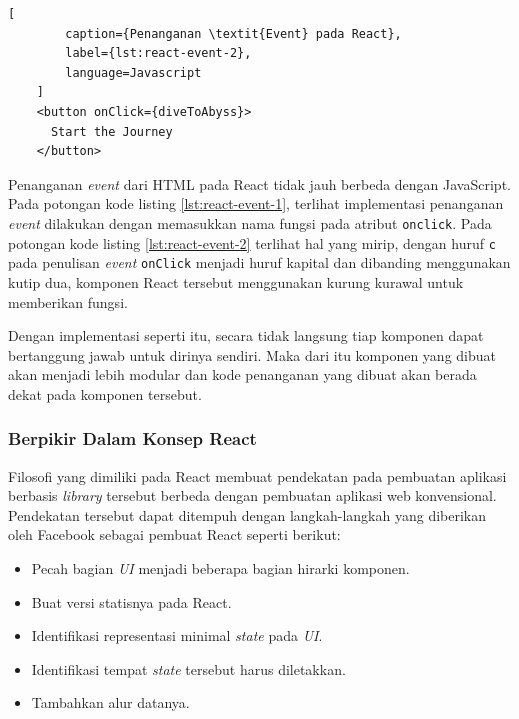     \begin{lstlisting}[
        caption={Penanganan \textit{Event} pada React}, 
        label={lst:react-event-2}, 
        language=Javascript
    ]
    <button onClick={diveToAbyss}>
      Start the Journey
    </button>
    \end{lstlisting}
    
    Penanganan \textit{event} dari HTML pada React tidak jauh berbeda dengan
    JavaScript. Pada potongan kode listing \ref{lst:react-event-1}, terlihat
    implementasi penanganan \textit{event} dilakukan dengan memasukkan nama
    fungsi pada atribut \texttt{onclick}. Pada potongan kode listing
    \ref{lst:react-event-2} terlihat hal yang mirip, dengan huruf \texttt{c}
    pada penulisan \textit{event} \texttt{onClick} menjadi huruf kapital dan
    dibanding menggunakan kutip dua, komponen React tersebut menggunakan kurung
    kurawal untuk memberikan fungsi.
    
    Dengan implementasi seperti itu, secara tidak langsung tiap komponen dapat
    bertanggung jawab untuk dirinya sendiri. Maka dari itu komponen yang dibuat
    akan menjadi lebih modular dan kode penanganan yang dibuat akan berada dekat
    pada komponen tersebut.
    
    
    \subsubsection{Berpikir Dalam Konsep React}
    Filosofi yang dimiliki pada React membuat pendekatan pada pembuatan aplikasi
    berbasis \textit{library} tersebut berbeda dengan pembuatan aplikasi web 
    konvensional. Pendekatan tersebut dapat ditempuh dengan langkah-langkah yang diberikan 
    oleh Facebook sebagai pembuat React\cite{facebook:react-thinking-in-react} 
    seperti berikut:
    
    \begin{itemize}
        \item Pecah bagian \textit{UI} menjadi beberapa bagian hirarki komponen.
        
        \item Buat versi statisnya pada React.
        
        \item Identifikasi representasi minimal \textit{state} pada \textit{UI}.
        
        \item Identifikasi tempat \textit{state} tersebut harus diletakkan.
        
        \item Tambahkan alur datanya.
    \end{itemize}
    
